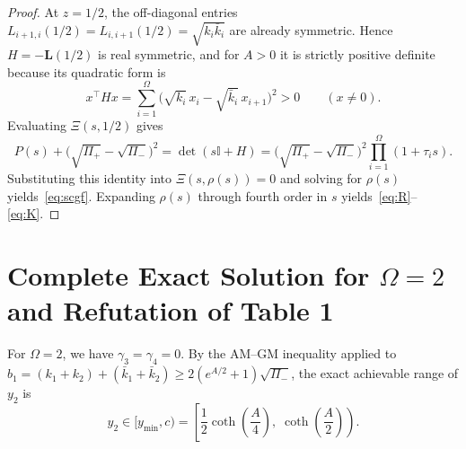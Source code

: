\documentclass[11pt]{article}
\theoremstyle{definition}
\theoremstyle{remark}
\begin{document}
\begin{proof}
At $z = 1/2$, the off-diagonal entries $L_{i+1,i}(1/2) = L_{i,i+1}(1/2) = \sqrt{k_i \bar{k}_i}$ are already symmetric. Hence $H = -\mathbf{L}(1/2)$ is real symmetric, and for $A > 0$ it is strictly positive definite because its quadratic form is
\[
  x^\top H x = \sum_{i=1}^\Omega \bigl(\sqrt{k_i}\,x_i - \sqrt{\bar{k}_i}\,x_{i+1}\bigr)^2 > 0 \qquad (x \neq 0).
\]
Evaluating $\Xi(s, 1/2)$ gives
\[
  P(s) + \bigl(\sqrt{\Pi_+} - \sqrt{\Pi_-}\bigr)^2 = \det(s\mathbb{I} + H) = \bigl(\sqrt{\Pi_+} - \sqrt{\Pi_-}\bigr)^2 \prod_{i=1}^\Omega (1 + \tau_i s).
\]
Substituting this identity into $\Xi(s, \rho(s)) = 0$ and solving for $\rho(s)$ yields~\eqref{eq:scgf}. Expanding $\rho(s)$ through fourth order in $s$ yields~\eqref{eq:R}--\eqref{eq:K}.
\end{proof}

\section{Complete Exact Solution for \texorpdfstring{$\Omega = 2$}{Omega = 2} and Refutation of Table 1}

For $\Omega = 2$, we have $\gamma_3 = \gamma_4 = 0$. By the AM--GM inequality applied to $b_1 = (k_1 + k_2) + (\bar{k}_1 + \bar{k}_2) \ge 2(e^{A/2} + 1)\sqrt{\Pi_-}$, the exact achievable range of $y_2$ is
\[
  y_2 \in [y_{\min}, c) = \left[\frac{1}{2}\coth\!\left(\frac{A}{4}\right),\; \coth\!\left(\frac{A}{2}\right)\right).
\]
\end{document}
